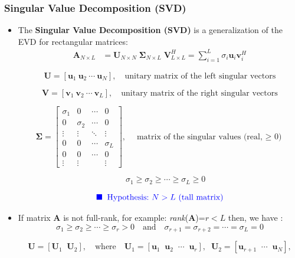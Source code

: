 \subsubsection{Singular Value Decomposition (SVD)}
\begin{itemize}
    \item The \textbf{Singular Value Decomposition (SVD)} is a generalization of the EVD for rectangular matrices:
\begin{align*}
\mathbf{A}_{N \times L}
&= \mathbf{U}_{N \times N} \; \mathbf{\Sigma}_{N \times L} \; \mathbf{V}^{H}_{L \times L}
= \sum_{i=1}^{L} \sigma_i \mathbf{u}_i \mathbf{v}_i^{H}
\end{align*}

\[
\mathbf{U} = [\mathbf{u}_1 ~ \mathbf{u}_2 ~ \cdots ~ \mathbf{u}_N],
\quad \text{unitary matrix of the left singular vectors}
\]

\[
\mathbf{V} = [\mathbf{v}_1 ~ \mathbf{v}_2 ~ \cdots ~ \mathbf{v}_L],
\quad \text{unitary matrix of the right singular vectors}
\]

\[
\mathbf{\Sigma} =
\begin{bmatrix}
\sigma_1 & 0      & \cdots & 0      \\
0        & \sigma_2 & \cdots & 0      \\
\vdots   & \vdots & \ddots & \vdots \\
0        & 0      & \cdots & \sigma_L \\
0        & 0      & \cdots & 0 \\
\vdots   & \vdots &        & \vdots
\end{bmatrix},
\quad \text{matrix of the singular values (real, $\geq$ 0)}
\]

\[
\;\;\;\;\;\sigma_1 \geq \sigma_2 \geq \cdots \geq \sigma_L \geq 0
\]

\[
\textcolor{blue}{\blacksquare\;\; \text{Hypothesis:}~ N > L~ \text{(tall matrix)}}
\]

    \item If matrix \textbf{A} is not full-rank, for example: \textit{rank}(\textbf{A})=\(r<L\) then, we have :
\[
\sigma_1 \geq \sigma_2 \geq \cdots \geq \sigma_r > 0
\quad \text{and} \quad
\sigma_{r+1} = \sigma_{r+2} = \cdots = \sigma_L = 0
\]

\[
\mathbf{U} = \left[ \mathbf{U}_1 \;\; \mathbf{U}_2 \right], \quad
\text{where}
\quad
\mathbf{U}_1 = \left[ \mathbf{u}_1 \;\; \mathbf{u}_2 \;\; \cdots \;\; \mathbf{u}_r \right],\;\;
\mathbf{U}_2 = \left[ \mathbf{u}_{r+1} \;\; \cdots \;\; \mathbf{u}_N \right],
\]


\end{itemize}
